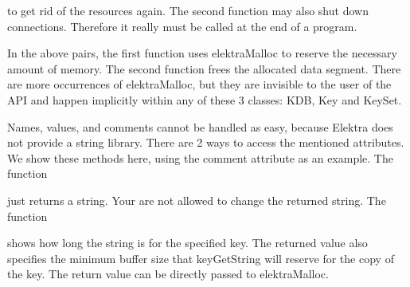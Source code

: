 to get rid of the resources again. The second function may also shut down connections. Therefore it really must be called at the end of a program.


\begin{DoxyCode}{0}
\DoxyCodeLine{}
\end{DoxyCode}


In the above pairs, the first function uses {\ttfamily elektra\+Malloc} to reserve the necessary amount of memory. The second function frees the allocated data segment. There are more occurrences of {\ttfamily elektra\+Malloc}, but they are invisible to the user of the A\+PI and happen implicitly within any of these 3 classes\+: {\ttfamily K\+DB}, {\ttfamily Key} and {\ttfamily Key\+Set}.

Names, values, and comments cannot be handled as easy, because Elektra does not provide a string library. There are 2 ways to access the mentioned attributes. We show these methods here, using the comment attribute as an example. The function


\begin{DoxyCode}{0}
\end{DoxyCode}


just returns a string. Your are not allowed to change the returned string. The function


\begin{DoxyCode}{0}
\end{DoxyCode}


shows how long the string is for the specified key. The returned value also specifies the minimum buffer size that {\ttfamily key\+Get\+String} will reserve for the copy of the key. The return value can be directly passed to {\ttfamily elektra\+Malloc}.


